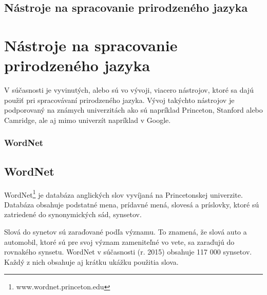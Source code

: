 %
%
{
	\subsection{Nástroje na spracovanie prirodzeného jazyka}
}
{
	\section{Nástroje na spracovanie prirodzeného jazyka}
}
\label{subsec:nlp_nastroje}
V súčasnosti je vyvinutých, alebo sú vo vývoji, viacero nástrojov, ktoré sa dajú použiť pri spracovávaní prirodzeného jazyka. Vývoj takýchto nástrojov je podporovaný na známych univerzitách ako sú napríklad Princeton, Stanford alebo Camridge, ale aj mimo univerzít napríklad v Google. 

%
%
{
	\subsubsection{WordNet}
}
{
	\subsection{WordNet}
}
\label{subsubsec:wordnet}
WordNet\footnote{www.wordnet.princeton.edu} je databáza anglických slov vyvíjaná na Princetonskej univerzite. Databáza obsahuje podstatné mena, prídavné mená, slovesá a príslovky, ktoré sú zatriedené do synonymických sád, synsetov.

Slová do synetov sú zaraďované podľa významu. To znamená, že slová auto a automobil, ktoré sú pre svoj význam zameniteľné vo vete, sa zaraďujú do rovnakého synsetu. WordNet v súčasnosti (r. 2015) obsahuje 117 000 synsetov. Každý z nich obsahuje aj krátku ukážku použitia slova.

